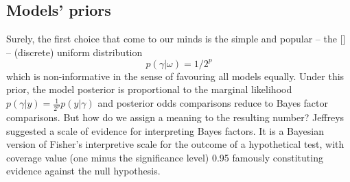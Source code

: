 \documentclass[11 pt]{article}
\begin{document}
\begin{multicols}{2}

\section{Models' priors}
Surely, the first choice that come to our minds is the simple and popular -- the  [\cite{CSI}] -- (discrete) uniform distribution
\begin{equation*}
    p(\gamma|\omega) = 1/2^p
\end{equation*}
which is non-informative in the sense of favouring all models equally. Under this prior, the model posterior is proportional to the marginal likelihood $p(\gamma|y) = \frac{1}{2^p} p(y|\gamma)$ and posterior odds comparisons reduce to Bayes factor comparisons. But how do we assign a meaning to the resulting number? Jeffreys suggested a scale of evidence for interpreting Bayes factors. It is a Bayesian version of Fisher’s interpretive scale for the outcome of a hypothetical test, with coverage value (one minus the significance level) 0.95 famously constituting  evidence against the null hypothesis.

\makeatletter
\newenvironment{tablehere}
  {\def\@captype{table}}
  {}

\newenvironment{figurehere}
  {\def\@captype{figure}}
  {}
\makeatother
\medskip
\begin{tablehere}
\centering
\sffamily
{}
\end{tablehere}
\medskip




\end{multicols}
\end{document}
